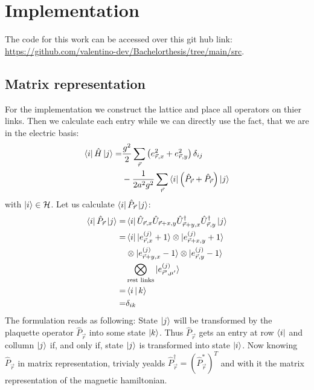 \section{Implementation}
The code for this work can be accessed over this git hub link: \url{https://github.com/valentino-dev/Bachelorthesis/tree/main/src}.
\subsection{Matrix representation}
For the implementation we construct the lattice and place all operators on thier links. Then we calculate each entry while we can directly use the fact, that we are in the electric basis:
\begin{align*}
	\bra{i}\hat{H}\ket{j} = & \frac{g^2}{2}\sum_{\vec{r}}\left(e_{\vec{r}, x}^2+e_{\vec{r}, y}^2\right)\delta_{ij}           \\
	                        & -\frac{1}{2a^2g^2}\sum_{\vec{r}}\bra{i}\left(\hat{P}_{\vec{r}}+\hat{P}_{\vec{r}}\right)\ket{j}
\end{align*}
with $\ket{i}\in\cal{H}$. Let us calculate $\bra{i}\hat{P}_{\vec{r}}\ket{j}$:
\begin{align*}
	\bra{i}\hat{P}_{\vec{r}}\ket{j}= & \bra{i}\hat{U}_{\vec{r}, x}\hat{U}_{\vec{r}+x,y}\hat{U}^{\dag}_{\vec{r}+y,x}\hat{U}^{\dag}_{\vec{r},y}\ket{j} \\
	=                                & \bra{i}\ket{e^{(j)}_{\vec{r}, x}+1}\otimes\ket{e^{(j)}_{\vec{r}+x, y}+1}                                      \\
	                                 & \otimes\ket{e^{(j)}_{\vec{r}+y, x}-1}\otimes\ket{e^{(j)}_{\vec{r}, y}-1}                                      \\
	                                 & \bigotimes_\text{rest links}\ket{e^{(j)}_{\vec{r}', \mu'}}                                                    \\
	=                                & \Braket{i|k}                                                                                                  \\
	=                                & \delta_{ik}
\end{align*}
The formulation reads as following: State $\ket{j}$ will be transformed by the plaquette operator $\hat{P}_{\vec{r}}$ into some state $\ket{k}$. Thus $\hat{P}_{\vec{r}}$ gets an entry at row $\bra{i}$ and collumn $\ket{j}$ if, and only if, state $\ket{j}$ is transformed into state $\ket{i}$. Now knowing $\hat{P}_{\vec{r}}$ in matrix representation, trivialy yealds $\hat{P}_{\vec{r}}^{\dag}=\left(\hat{P}_{\vec{r}}^{*}\right)^{T}$ and with it the matrix representation of the magnetic hamiltonian.

